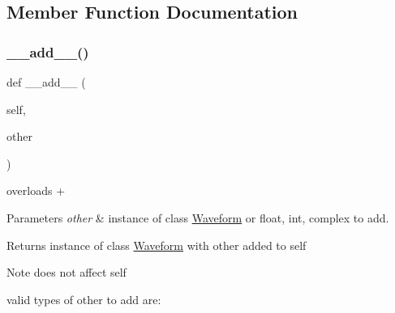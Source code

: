 \subsection{Member Function Documentation}
\mbox{\label{classSignalIntegrity_1_1TimeDomain_1_1Waveform_1_1Waveform_1_1Waveform_a547cf97e438ebc6734fd6d1ea2b21b6d}} 
\subsubsection{\texorpdfstring{\+\_\+\+\_\+add\+\_\+\+\_\+()}{\_\_add\_\_()}}
{\footnotesize\ttfamily def \+\_\+\+\_\+add\+\_\+\+\_\+ (\begin{DoxyParamCaption}\item[{}]{self,  }\item[{}]{other }\end{DoxyParamCaption})}



overloads + 


\begin{DoxyParams}{Parameters}
{\em other} & instance of class \hyperlink{classSignalIntegrity_1_1TimeDomain_1_1Waveform_1_1Waveform_1_1Waveform}{Waveform} or float, int, complex to add. \\
\hline
\end{DoxyParams}
\begin{DoxyReturn}{Returns}
instance of class \hyperlink{classSignalIntegrity_1_1TimeDomain_1_1Waveform_1_1Waveform_1_1Waveform}{Waveform} with other added to self 
\end{DoxyReturn}
\begin{DoxyNote}{Note}
does not affect self 

valid types of other to add are\+:
\end{DoxyNote}

